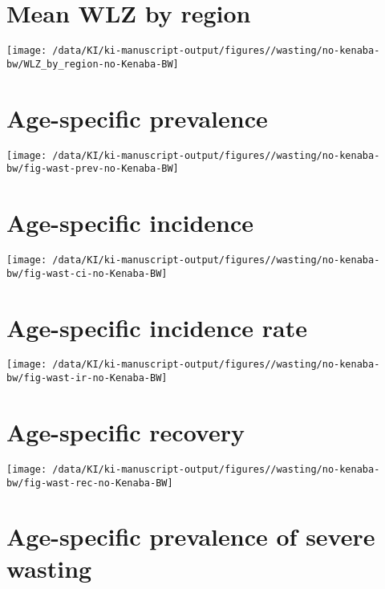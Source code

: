 \documentclass[
  9pt,
]{book}
\begin{document}
\hypertarget{mean-wlz-by-region}{%
\section{Mean WLZ by region}\label{mean-wlz-by-region}}

\texttt{[image: /data/KI/ki-manuscript-output/figures//wasting/no-kenaba-bw/WLZ\_by\_region-no-Kenaba-BW]}

\hypertarget{age-specific-prevalence-2}{%
\section{Age-specific prevalence}\label{age-specific-prevalence-2}}

\texttt{[image: /data/KI/ki-manuscript-output/figures//wasting/no-kenaba-bw/fig-wast-prev-no-Kenaba-BW]}

\hypertarget{age-specific-incidence-1}{%
\section{Age-specific incidence}\label{age-specific-incidence-1}}

\texttt{[image: /data/KI/ki-manuscript-output/figures//wasting/no-kenaba-bw/fig-wast-ci-no-Kenaba-BW]}

\hypertarget{age-specific-incidence-rate-1}{%
\section{Age-specific incidence rate}\label{age-specific-incidence-rate-1}}

\texttt{[image: /data/KI/ki-manuscript-output/figures//wasting/no-kenaba-bw/fig-wast-ir-no-Kenaba-BW]}

\hypertarget{age-specific-recovery-1}{%
\section{Age-specific recovery}\label{age-specific-recovery-1}}

\texttt{[image: /data/KI/ki-manuscript-output/figures//wasting/no-kenaba-bw/fig-wast-rec-no-Kenaba-BW]}

\hypertarget{age-specific-prevalence-of-severe-wasting-2}{%
\section{Age-specific prevalence of severe wasting}\label{age-specific-prevalence-of-severe-wasting-2}}
\end{document}
